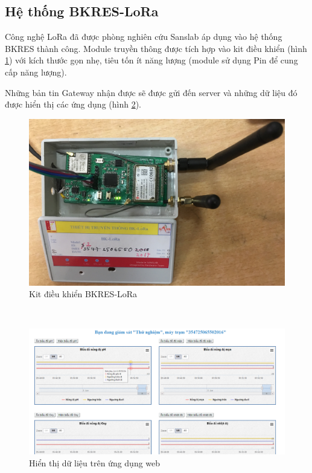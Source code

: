 \subsection{Hệ thống BKRES-LoRa}
Công nghệ LoRa đã được phòng nghiên cứu Sanslab áp dụng vào hệ thống BKRES thành công. Module truyền thông được tích hợp vào kit điều khiển (hình \ref{KitBKRES_LoRa}{}) với kích thước gọn nhẹ, tiêu tốn ít năng lượng (module sử dụng Pin để cung cấp năng lượng).
\par 
Những bản tin Gateway nhận được sẽ được gửi đến server và những dữ liệu đó được hiển thị các ứng dụng (hình \ref{Webapp}{}).\\
\begin{figure}[h]
\centering
\includegraphics[scale=0.08]{image/KitBKRES_LoRa}
\caption{Kit điều khiển BKRES-LoRa}
\label{KitBKRES_LoRa}
\end{figure}\\
\begin{figure}[h]
\centering
\includegraphics[scale=0.3]{image/application}
\caption{Hiển thị dữ liệu trên ứng dụng web}
\label{Webapp}
\end{figure}
